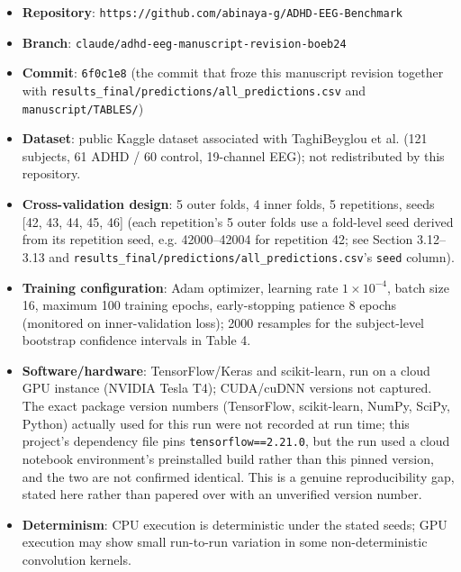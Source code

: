 \documentclass[a4paper,fleqn]{cas-sc}
\begin{document}
\begin{itemize}

\item \textbf{Repository}: \texttt{https://github.com/abinaya-g/ADHD-EEG-Benchmark}

\item \textbf{Branch}: \texttt{claude/adhd-eeg-manuscript-revision-boeb24}

\item \textbf{Commit}: \texttt{6f0c1e8} (the commit that froze this manuscript revision together with \texttt{results\_final/predictions/all\_predictions.csv} and \texttt{manuscript/TABLES/})

\item \textbf{Dataset}: public Kaggle dataset associated with TaghiBeyglou et al. \cite{taghibeyglou2022detection} (121 subjects, 61 ADHD / 60 control, 19-channel EEG); not redistributed by this repository.

\item \textbf{Cross-validation design}: 5 outer folds, 4 inner folds, 5 repetitions, seeds [42, 43, 44, 45, 46] (each repetition's 5 outer folds use a fold-level seed derived from its repetition seed, e.g. 42000--42004 for repetition 42; see Section 3.12--3.13 and \texttt{results\_final/predictions/all\_predictions.csv}'s \texttt{seed} column).

\item \textbf{Training configuration}: Adam optimizer, learning rate $1\times10^{-4}$, batch size 16, maximum 100 training epochs, early-stopping patience 8 epochs (monitored on inner-validation loss); 2000 resamples for the subject-level bootstrap confidence intervals in Table 4.

\item \textbf{Software/hardware}: TensorFlow/Keras and scikit-learn, run on a cloud GPU instance (NVIDIA Tesla T4); CUDA/cuDNN versions not captured. The exact package version numbers (TensorFlow, scikit-learn, NumPy, SciPy, Python) actually used for this run were not recorded at run time; this project's dependency file pins \texttt{tensorflow==2.21.0}, but the run used a cloud notebook environment's preinstalled build rather than this pinned version, and the two are not confirmed identical. This is a genuine reproducibility gap, stated here rather than papered over with an unverified version number.

\item \textbf{Determinism}: CPU execution is deterministic under the stated seeds; GPU execution may show small run-to-run variation in some non-deterministic convolution kernels.

\end{itemize}
\end{document}
